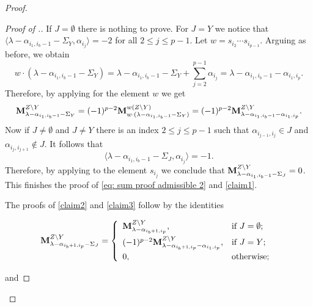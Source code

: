\begin{proof}
\begin{proof}[Proof of .]
If $J=\emptyset$ there is nothing to prove. For $J=Y$ we notice that $\langle\lambda - \alpha_{i_{1},i_{b}-1}-\Sigma_{Y},\alpha_{i_{j}}\rangle = -2$ for all $2\leq j\leq p-1$. Let $w=s_{i_2}\cdots s_{i_{p-1}}$. Arguing as before, we obtain
\begin{equation}
      w\cdot(\lambda - \alpha_{i_{1},i_{b}-1} -{\Sigma_{Y}}) =\lambda - \alpha_{i_{1},i_{b}-1} -{\Sigma_{Y}} +\sum_{j=2}^{p-1} \alpha_{i_j} =
       \lambda - \alpha_{i_{1},i_{b}-1} -\alpha_{i_{1},i_{p}}.
\end{equation}
Therefore, by applying  for the element $w$ we get
\begin{equation}
    \mathbf{M}^{Z\setminus Y}_{\lambda - \alpha_{i_{1},i_{b}-1}-\Sigma_{Y}}  = (-1)^{p-2} \mathbf{M}^{w(Z\setminus Y)}_{ w\cdot(\lambda - \alpha_{i_{1},i_{b}-1} -{\Sigma_{Y}})} = (-1)^{p-2} \mathbf{M}^{Z\setminus Y}_{\lambda - \alpha_{i_{1},i_{b}-1} -\alpha_{i_{1},i_{p}}}.  
\end{equation}
Now if $J\neq \emptyset $ and $J\neq Y$ there is an index $2\leq j \leq p-1$ such that $\alpha_{i_{j-1},i_j}\in J$ and $\alpha_{i_j,i_{j+1}}\notin J$. It follows that 
\begin{equation}
    \langle\lambda - \alpha_{i_{1},i_{b}-1}-\Sigma_{J},\alpha_{i_j}\rangle =-1.
\end{equation}
Therefore, by applying   to the element $s_{i_j}$ we conclude that $\mathbf{M}^{Z\setminus Y}_{\lambda - \alpha_{i_{1},i_{b}-1}-\Sigma_{J}}=0$. This finishes the proof of \eqref{eq: sum proof admissible 2} and \eqref{claim1}. 
 

The proofs of \eqref{claim2} and \eqref{claim3} follow by the identities

  \begin{equation}\label{eq: sum proof admissible 3}
        \mathbf{M}_{\lambda - \alpha_{i_{b}+1,i_{p}}-{\Sigma_{J}}}^{Z\setminus Y} = \left\{ \begin{array}{ll}
            \mathbf{M}_{\lambda - \alpha_{i_{b}+1,i_{p}}}^{Z\setminus Y}, &\text{if }J=\emptyset ; \\[5pt]
            (-1)^{p-2}\mathbf{M}_{\lambda - \alpha_{i_{b}+1,i_{p}} - \alpha_{i_{1},i_{p}}}^{Z\setminus Y}, &\text{if } J=Y ;\\[5pt]
            0, &\text{otherwise; }
        \end{array}\right.
    \end{equation}

and  


\end{proof}
\end{proof}
